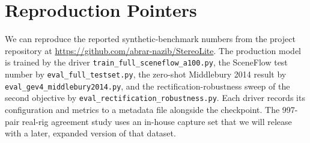 \section{Reproduction Pointers}
\begin{sloppypar}
We can reproduce the reported synthetic-benchmark numbers from the
project repository at \url{https://github.com/abrar-nazib/StereoLite}.
The production model is trained by the driver
\texttt{train\_full\_sceneflow\_a100.py}, the SceneFlow test number by
\texttt{eval\_full\_testset.py}, the zero-shot Middlebury 2014 result by
\texttt{eval\_gev4\_middlebury2014.py}, and the rectification-robustness
sweep of the second objective by
\texttt{eval\_rectification\_robustness.py}. Each driver records its
configuration and metrics to a metadata file alongside the checkpoint.
The 997-pair real-rig agreement study uses an in-house capture set that
we will release with a later, expanded version of that dataset.
\end{sloppypar}

